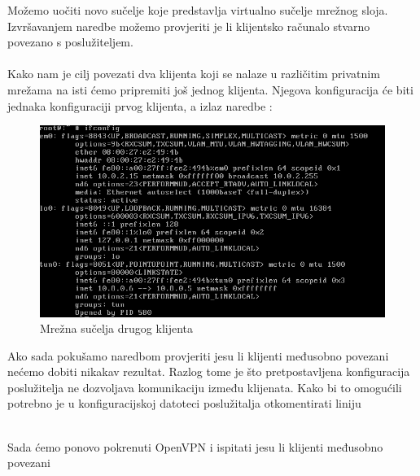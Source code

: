         Možemo uočiti novo sučelje  koje predstavlja virtualno
        sučelje mrežnog sloja. Izvršavanjem naredbe  možemo provjeriti je
        li klijentsko računalo stvarno povezano s poslužiteljem. \\

        \noindent
         \\

        Kako nam je cilj povezati dva klijenta koji se nalaze u različitim
        privatnim mrežama na isti ćemo pripremiti još jednog klijenta. Njegova
        konfiguracija će biti jednaka konfiguraciji prvog klijenta, a izlaz
        naredbe :
        \begin{figure}[H]
            \centering
            \includegraphics[scale=0.45]{slike/client2Ifconfig}
            \caption{Mrežna sučelja drugog klijenta}
        \end{figure}

        \noindent
        Ako sada pokušamo naredbom
        provjeriti jesu li klijenti međusobno povezani nećemo dobiti nikakav
        rezultat. Razlog tome je što pretpostavljena konfiguracija poslužitelja
        ne dozvoljava komunikaciju između klijenata. Kako bi to omogućili
        potrebno je u konfiguracijskoj datoteci poslužitalja otkomentirati liniju 

        \noindent 
         \\

        \noindent
        Sada ćemo ponovo pokrenuti OpenVPN i ispitati jesu li klijenti
        međusobno povezani \\

